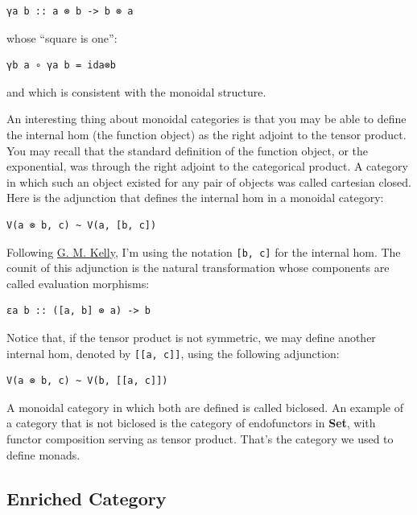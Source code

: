 \begin{verbatim}
γa b :: a ⊗ b -> b ⊗ a
\end{verbatim}

whose ``square is one'':

\begin{verbatim}
γb a ∘ γa b = ida⊗b
\end{verbatim}

and which is consistent with the monoidal structure.

An interesting thing about monoidal categories is that you may be able
to define the internal hom (the function object) as the right adjoint to
the tensor product. You may recall that the standard definition of the
function object, or the exponential, was through the right adjoint to
the categorical product. A category in which such an object existed for
any pair of objects was called cartesian closed. Here is the adjunction
that defines the internal hom in a monoidal category:

\begin{verbatim}
V(a ⊗ b, c) ~ V(a, [b, c])
\end{verbatim}

Following
\href{http://www.tac.mta.ca/tac/reprints/articles/10/tr10.pdf}{G. M.
Kelly}, I'm using the notation \texttt{{[}b,\ c{]}} for the internal
hom. The counit of this adjunction is the natural transformation whose
components are called evaluation morphisms:

\begin{verbatim}
εa b :: ([a, b] ⊗ a) -> b
\end{verbatim}

Notice that, if the tensor product is not symmetric, we may define
another internal hom, denoted by \texttt{{[}{[}a,\ c{]}{]}}, using the
following adjunction:

\begin{verbatim}
V(a ⊗ b, c) ~ V(b, [[a, c]])
\end{verbatim}

A monoidal category in which both are defined is called biclosed. An
example of a category that is not biclosed is the category of
endofunctors in \textbf{Set}, with functor composition serving as tensor
product. That's the category we used to define monads.

\subsection{Enriched Category}\label{enriched-category}

